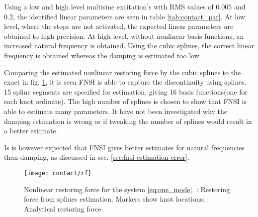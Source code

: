 Using a low and high level multisine excitation's with RMS values of $0.005$ and
$0.2$, the identified linear parameters are seen in table \ref{tab:contact_par}.
At low level, where the stops are not activated, the expected linear parameters
are obtained to high precision. At high level, without nonlinear basis
functions, an increased natural frequency is obtained. Using the cubic splines,
the correct linear frequency is obtained whereas the damping is estimated too
low.

\begin{center}
  \label{tab:contact_par}
\end{center}


Comparing the estimated nonlinear restoring force by the cubic splines to the
exact in fig. \ref{fig:contact_rf}, it is seen FNSI is able to capture the
discontinuity using splines. 15 spline segments are specified for estimation,
giving 16 basis functions(one for each knot ordinate). The high number of
splines is chosen to show that FNSI is able to estimate many parameters.
It have not been investigated why the damping estimation is wrong or if
tweaking the number of splines would result in a better estimate.

Is is however expected that FNSI gives better estimates for natural frequencies
than damping, as discussed in sec. \ref{sec:fnsi-estimation-error}.

\begin{figure}
  \centering
  \texttt{[image: contact/rf]}
  \caption{
    Nonlinear restoring force for the system \eqref{eq:one_mode}.
    \sampleline{}: Restoring force from splines estimation. Markers show knot locations;
    \textcolor{blue}{}: Analytical restoring force
  }
  \label{fig:contact_rf}
\end{figure}





\FloatBarrier



